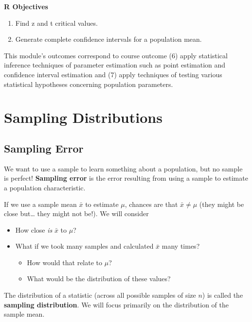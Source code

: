 \documentclass[
]{book}
\providecommand{\tightlist}{%
  \setlength{\itemsep}{0pt}\setlength{\parskip}{0pt}}
\begin{document}
\textbf{R Objectives}

\begin{enumerate}
\def\labelenumi{\arabic{enumi}.}
\tightlist
\item
  Find z and t critical values.
\item
  Generate complete confidence intervals for a population mean.
\end{enumerate}

This module's outcomes correspond to course outcome (6) apply statistical inference techniques of parameter estimation such as point estimation and confidence interval estimation and (7) apply techniques of testing various statistical hypotheses concerning population parameters.

\section{Sampling Distributions}\label{sampling-distributions}

\subsection{Sampling Error}\label{sampling-error}

We want to use a sample to learn something about a population, but no sample is perfect! \textbf{Sampling error} is the error resulting from using a sample to estimate a population characteristic.

If we use a sample mean \(\bar{x}\) to estimate \(\mu\), chances are that \(\bar{x}\ne\mu\) (they might be close but\ldots{} they might not be!). We will consider

\begin{itemize}
\tightlist
\item
  How close \emph{is} \(\bar{x}\) to \(\mu\)?
\item
  What if we took many samples and calculated \(\bar{x}\) many times?

  \begin{itemize}
  \tightlist
  \item
    How would that relate to \(\mu\)?
  \item
    What would be the distribution of these values?
  \end{itemize}
\end{itemize}

The distribution of a statistic (across all possible samples of size \(n\)) is called the \textbf{sampling distribution}. We will focus primarily on the distribution of the sample mean.
\end{document}
